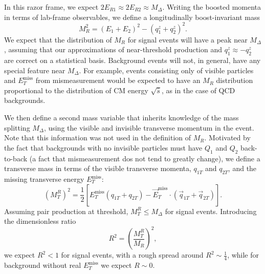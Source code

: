 In this razor frame, we expect $2E_{R1} \approx 2E_{R2} \approx M_\Delta$. Writing the boosted momenta in terms of lab-frame observables, we define a longitudinally boost-invariant mass
\begin{equation}
M_R^2 = (E_1+E_2)^2 - (q_1^z+q_2^z)^2. \label{eq:MR}
\end{equation}
We expect that the distribution of $M_R$ for signal events will have a peak near $M_\Delta$, assuming that our approximations of near-threshold production and $q_1^z \approx - q_2^z$ are correct on a statistical basis. Background events will not, in general, have any special feature near $M_\Delta$. For example, events consisting only of visible particles and $E_{T}^\text{miss}$ from mismeasurement would be expected to have an $M_R$ distribution proportional to the distribution of CM energy $\sqrt{\hat{s}}$, as in the case of QCD backgrounds. 

We then define a second mass variable that inherits knowledge of the mass splitting $M_\Delta$, using the visible and invisible transverse momentum in the event. Note that this information was not used in the definition of $M_R$. Motivated by the fact that backgrounds with no invisible particles must have $Q_1$ and $Q_2$ back-to-back (a fact that mismeasurement dos not tend to greatly change), we define a transverse mass in terms of the visible transverse momenta, $q_{1T}$ and $q_{2T}$, and the missing transverse energy $E_T^\text{miss}$:
\begin{equation}
(M_T^R)^2 = \frac{1}{2}\left[E_T^\text{miss} (q_{1T}+q_{2T})-\vec{E}^\text{miss}_T \cdot (\vec{q}_{1T} +\vec{q}_{2T})\right]. \label{eq:MTR}
\end{equation}
Assuming pair production at threshold, $M_T^R \leq M_\Delta$ for signal events. Introducing the dimensionless ratio
\begin{equation}
R^2 = \left(\frac{M_T^R}{M_R}\right)^2, \label{eq:R}
\end{equation}
we expect $R^2 < 1$ for signal events, with a rough spread around $R^2 \sim \tfrac{1}{4}$, while
for background without real $E_T^\text{miss}$ we expect $R\sim 0$. 

